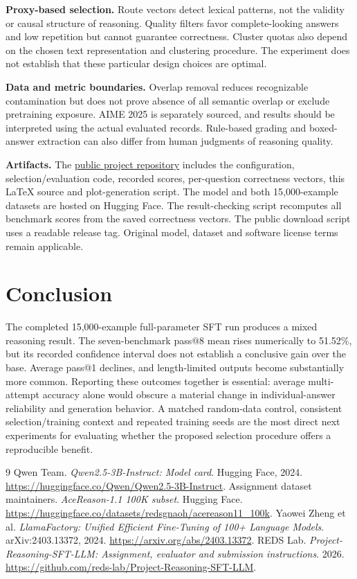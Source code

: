 \documentclass[11pt,letterpaper]{article}
\begin{document}
\textbf{Proxy-based selection.} Route vectors detect lexical patterns, not the validity or causal structure of reasoning. Quality filters favor complete-looking answers and low repetition but cannot guarantee correctness. Cluster quotas also depend on the chosen text representation and clustering procedure. The experiment does not establish that these particular design choices are optimal.

\textbf{Data and metric boundaries.} Overlap removal reduces recognizable contamination but does not prove absence of all semantic overlap or exclude pretraining exposure. AIME 2025 is separately sourced, and results should be interpreted using the actual evaluated records. Rule-based grading and boxed-answer extraction can also differ from human judgments of reasoning quality.

\textbf{Artifacts.} The \href{https://github.com/rohitsalla/reasoning-sft-submission}{public project repository} includes the configuration, selection/evaluation code, recorded scores, per-question correctness vectors, this LaTeX source and plot-generation script. The model and both 15,000-example datasets are hosted on Hugging Face. The result-checking script recomputes all benchmark scores from the saved correctness vectors. The public download script uses a readable release tag. Original model, dataset and software license terms remain applicable.

\section{Conclusion}
The completed 15,000-example full-parameter SFT run produces a mixed reasoning result. The seven-benchmark pass@8 mean rises numerically to 51.52\%, but its recorded confidence interval does not establish a conclusive gain over the base. Average pass@1 declines, and length-limited outputs become substantially more common. Reporting these outcomes together is essential: average multi-attempt accuracy alone would obscure a material change in individual-answer reliability and generation behavior. A matched random-data control, consistent selection/training context and repeated training seeds are the most direct next experiments for evaluating whether the proposed selection procedure offers a reproducible benefit.

\FloatBarrier
\begin{thebibliography}{9}
 Qwen Team. \emph{Qwen2.5-3B-Instruct: Model card}. Hugging Face, 2024. \url{https://huggingface.co/Qwen/Qwen2.5-3B-Instruct}.
 Assignment dataset maintainers. \emph{AceReason-1.1 100K subset}. Hugging Face. \url{https://huggingface.co/datasets/redsgnaoh/acereason11_100k}.
 Yaowei Zheng et al. \emph{LlamaFactory: Unified Efficient Fine-Tuning of 100+ Language Models}. arXiv:2403.13372, 2024. \url{https://arxiv.org/abs/2403.13372}.
 REDS Lab. \emph{Project-Reasoning-SFT-LLM: Assignment, evaluator and submission instructions}. 2026. \url{https://github.com/reds-lab/Project-Reasoning-SFT-LLM}.
\end{thebibliography}
\end{document}
